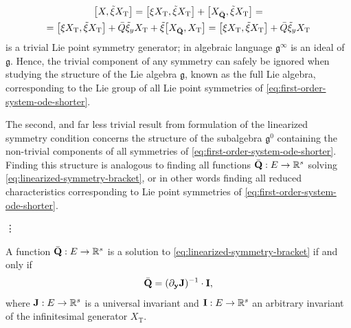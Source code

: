 \begin{multline}
  \comm{X}{\tilde{\xi} X_{\text{T}}} =
  \comm{\xi X_{\text{T}}}{\tilde{\xi} X_{\text{T}}} + \comm{X_{\bar{\vb{Q}}}}{\tilde{\xi} X_{\text{T}}} =\\
  = \comm{\xi X_{\text{T}}}{\tilde{\xi} X_{\text{T}}} + \bar{Q} \tilde{\xi}_y X_{\text{T}} + \tilde{\xi} \comm{X_{\bar{\vb{Q}}}}{X_{\text{T}}} =
  \comm{\xi X_{\text{T}}}{\tilde{\xi} X_{\text{T}}} + \bar{Q} \tilde{\xi}_y X_{\text{T}}
\end{multline}
is a trivial Lie point symmetry generator; in algebraic language \(\mathfrak{g}^\infty\) is an ideal of \(\mathfrak{g}\).
Hence, the trivial component of any symmetry can safely be ignored when studying the structure of the Lie algebra \(\mathfrak{g}\), known as the full Lie algebra, corresponding to the Lie group of all Lie point symmetries of \cref{eq:first-order-system-ode-shorter}.

The second, and far less trivial result from formulation  of the linearized symmetry condition concerns the structure of the subalgebra \(\mathfrak{g}^0\) containing the non-trivial components of all symmetries of \cref{eq:first-order-system-ode-shorter}.
Finding this structure is analogous to finding all functions \(\bar{\vb{Q}}: E \to \mathbb{R}^s\) solving \cref{eq:linearized-symmetry-bracket}, or in other words finding all reduced characteristics corresponding to Lie point symmetries of \cref{eq:first-order-system-ode-shorter}.

\vdots

\begin{cor} \label{cor:reduced-characteristic-decomposition}
  A function \(\bar{\vb{Q}}: E \to \mathbb{R}^s\) is a solution to \cref{eq:linearized-symmetry-bracket} if and only if
  \begin{equation}
    \bar{\vb{Q}} = (\partial_{\vb{y}} \vb{J})^{-1} \cdot \vb{I},
  \end{equation}
  where \(\vb{J}: E \to \mathbb{R}^s\) is a universal invariant and \(\vb{I}: E \to \mathbb{R}^s\) an arbitrary invariant of the infinitesimal generator \(X_{\text{T}}\).
\end{cor}

